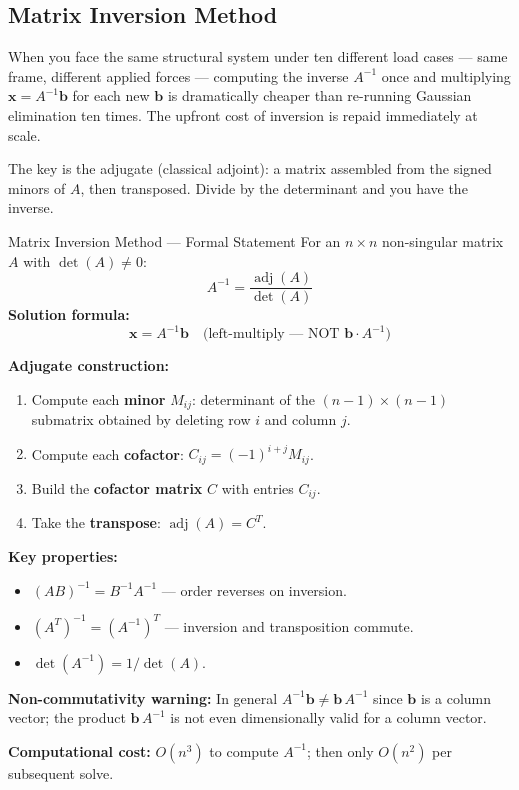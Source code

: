 \documentclass[12pt,a4paper]{article}
\begin{document}
\subsection{Matrix Inversion Method}

When you face the same structural system under ten different load cases --- same frame, different applied forces --- computing the inverse \(A^{-1}\) once and multiplying \(\mathbf{x} = A^{-1}\mathbf{b}\) for each new \(\mathbf{b}\) is dramatically cheaper than re-running Gaussian elimination ten times. The upfront cost of inversion is repaid immediately at scale.

The key is the adjugate (classical adjoint): a matrix assembled from the signed minors of \(A\), then transposed. Divide by the determinant and you have the inverse.

\begin{infobox}{Matrix Inversion Method --- Formal Statement}
For an \(n \times n\) non-singular matrix \(A\) with \(\det(A) \neq 0\):
\[
A^{-1} = \frac{\operatorname{adj}(A)}{\det(A)}
\]
\textbf{Solution formula:}
\[
\mathbf{x} = A^{-1}\mathbf{b} \quad \text{(left-multiply --- NOT } \mathbf{b} \cdot A^{-1}\text{)}
\]

\textbf{Adjugate construction:}
\begin{enumerate}[noitemsep]
  \item Compute each \textbf{minor} \(M_{ij}\): determinant of the \((n-1)\times(n-1)\) submatrix obtained by deleting row \(i\) and column \(j\).
  \item Compute each \textbf{cofactor}: \(C_{ij} = (-1)^{i+j} M_{ij}\).
  \item Build the \textbf{cofactor matrix} \(C\) with entries \(C_{ij}\).
  \item Take the \textbf{transpose}: \(\operatorname{adj}(A) = C^{T}\).
\end{enumerate}

\textbf{Key properties:}
\begin{itemize}[noitemsep]
  \item \((AB)^{-1} = B^{-1}A^{-1}\) --- order reverses on inversion.
  \item \((A^{T})^{-1} = (A^{-1})^{T}\) --- inversion and transposition commute.
  \item \(\det(A^{-1}) = 1/\det(A)\).
\end{itemize}

\textbf{Non-commutativity warning:} In general \(A^{-1}\mathbf{b} \neq \mathbf{b}\, A^{-1}\) since \(\mathbf{b}\) is a column vector; the product \(\mathbf{b}\, A^{-1}\) is not even dimensionally valid for a column vector.

\textbf{Computational cost:} \(O(n^{3})\) to compute \(A^{-1}\); then only \(O(n^{2})\) per subsequent solve.
\end{infobox}
\end{document}

